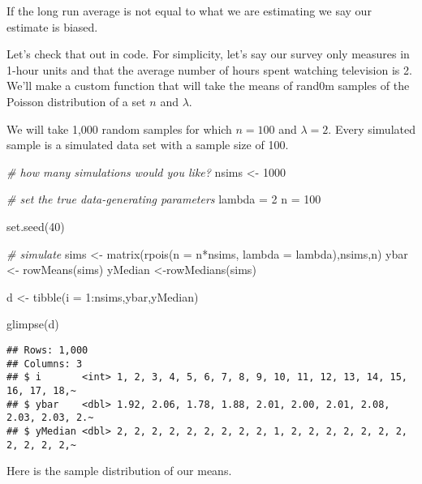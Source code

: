 \documentclass[
]{article}
\newenvironment{Shaded}{\begin{snugshade}}{\end{snugshade}}
\newcommand{\AttributeTok}[1]{\textcolor[rgb]{0.77,0.63,0.00}{#1}}
\newcommand{\CommentTok}[1]{\textcolor[rgb]{0.56,0.35,0.01}{\textit{#1}}}
\newcommand{\DecValTok}[1]{\textcolor[rgb]{0.00,0.00,0.81}{#1}}
\newcommand{\FunctionTok}[1]{\textcolor[rgb]{0.00,0.00,0.00}{#1}}
\newcommand{\NormalTok}[1]{#1}
\newcommand{\OtherTok}[1]{\textcolor[rgb]{0.56,0.35,0.01}{#1}}
\newcommand{\SpecialCharTok}[1]{\textcolor[rgb]{0.00,0.00,0.00}{#1}}
\begin{document}
If the long run average is not equal to what we are estimating we say
our estimate is biased.

Let's check that out in code. For simplicity, let's say our survey only
measures in 1-hour units and that the average number of hours spent
watching television is 2. We'll make a custom function that will take
the means of rand0m samples of the Poisson distribution of a set \(n\)
and \(\lambda\).

We will take 1,000 random samples for which \(n = 100\) and
\(\lambda = 2\). Every simulated sample is a simulated data set with a
sample size of 100.

\begin{Shaded}
\begin{Highlighting}[]
\CommentTok{\# how many simulations would you like?}
\NormalTok{nsims }\OtherTok{\textless{}{-}} \DecValTok{1000}

\CommentTok{\# set the true data{-}generating parameters}
\NormalTok{lambda }\OtherTok{=} \DecValTok{2}
\NormalTok{n }\OtherTok{=} \DecValTok{100}

\FunctionTok{set.seed}\NormalTok{(}\DecValTok{40}\NormalTok{)}

\CommentTok{\# simulate}
\NormalTok{sims }\OtherTok{\textless{}{-}} \FunctionTok{matrix}\NormalTok{(}\FunctionTok{rpois}\NormalTok{(}\AttributeTok{n =}\NormalTok{ n}\SpecialCharTok{*}\NormalTok{nsims, }\AttributeTok{lambda =}\NormalTok{ lambda),nsims,n)}
\NormalTok{ybar }\OtherTok{\textless{}{-}} \FunctionTok{rowMeans}\NormalTok{(sims)}
\NormalTok{yMedian }\OtherTok{\textless{}{-}}\FunctionTok{rowMedians}\NormalTok{(sims)}

\NormalTok{d }\OtherTok{\textless{}{-}}
  \FunctionTok{tibble}\NormalTok{(}\AttributeTok{i =} \DecValTok{1}\SpecialCharTok{:}\NormalTok{nsims,ybar,yMedian) }

\FunctionTok{glimpse}\NormalTok{(d)}
\end{Highlighting}
\end{Shaded}

\begin{verbatim}
## Rows: 1,000
## Columns: 3
## $ i       <int> 1, 2, 3, 4, 5, 6, 7, 8, 9, 10, 11, 12, 13, 14, 15, 16, 17, 18,~
## $ ybar    <dbl> 1.92, 2.06, 1.78, 1.88, 2.01, 2.00, 2.01, 2.08, 2.03, 2.03, 2.~
## $ yMedian <dbl> 2, 2, 2, 2, 2, 2, 2, 2, 2, 1, 2, 2, 2, 2, 2, 2, 2, 2, 2, 2, 2,~
\end{verbatim}

Here is the sample distribution of our means.
\end{document}
